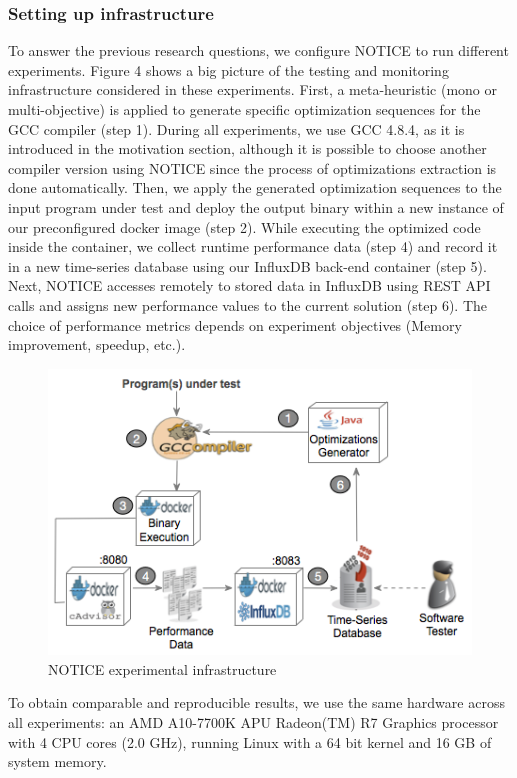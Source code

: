 \subsubsection{Setting up infrastructure}
To answer the previous research questions, we configure NOTICE to run different experiments. Figure 4 shows a big picture of the testing and monitoring infrastructure considered in these experiments. 
First, a meta-heuristic (mono or multi-objective) is applied to generate specific optimization sequences for the GCC compiler (step 1). During all experiments, we use GCC 4.8.4, as it is introduced in the motivation section, although it is possible to choose another compiler version using NOTICE since the process of optimizations extraction is done automatically. 
Then, we apply the generated optimization sequences to the input program under test and deploy the output binary within a new instance of our preconfigured docker image (step 2). While executing the optimized code inside the container, we collect runtime performance data (step 4) and record it in a new time-series database using our InfluxDB back-end container (step 5). Next, NOTICE accesses remotely to stored data in InfluxDB using REST API calls and assigns new performance values to the current solution (step 6). The choice of performance metrics depends on experiment objectives (Memory improvement, speedup, etc.).
\begin{figure}[h]
	\centering
	\includegraphics[width=0.9\linewidth]{Ressources/infraup.png}
	\caption{NOTICE experimental infrastructure}
\end{figure}

To obtain comparable and reproducible results, we use the same hardware across all experiments: an AMD A10-7700K APU Radeon(TM) R7 Graphics processor with 4 CPU cores (2.0 GHz), running Linux with a 64 bit kernel and 16 GB of system memory.


